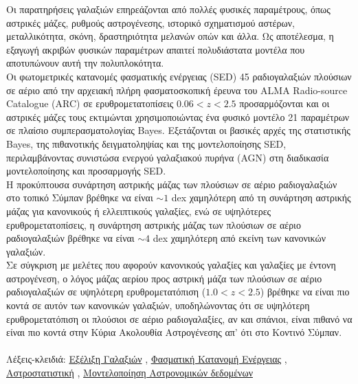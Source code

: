 Οι παρατηρήσεις γαλαξιών επηρεάζονται από πολλές φυσικές παραμέτρους, όπως αστρικές μάζες, ρυθμούς αστρογένεσης, ιστορικό σχηματισμού αστέρων, μεταλλικότητα, σκόνη, δραστηριότητα μελανών οπών και άλλα. Ως αποτέλεσμα, η εξαγωγή ακριβών φυσικών παραμέτρων απαιτεί πολυδιάστατα μοντέλα που αποτυπώνουν αυτή την πολυπλοκότητα.\\
Οι φωτομετρικές κατανομές φασματικής ενέργειας (SED) 45 ραδιογαλαξιών πλούσιων σε αέριο από την αρχειακή πλήρη φασματοσκοπική έρευνα του ALMA Radio-source Catalogue (ARC) σε ερυθρομετατοπίσεις $0.06<z<2.5$ προσαρμόζονται και οι αστρικές μάζες τους εκτιμώνται χρησιμοποιώντας ένα φυσικό μοντέλο 21 παραμέτρων σε πλαίσιο συμπερασματολογίας Bayes. Εξετάζονται οι βασικές αρχές της στατιστικής Bayes, της πιθανοτικής δειγματοληψίας και της μοντελοποίησης SED, περιλαμβάνοντας συνιστώσα ενεργού γαλαξιακού πυρήνα (AGN) στη διαδικασία μοντελοποίησης και προσαρμογής SED.\\
Η προκύπτουσα συνάρτηση αστρικής μάζας των πλούσιων σε αέριο ραδιογαλαξιών στο τοπικό Σύμπαν βρέθηκε να είναι $\sim 1$ dex χαμηλότερη από τη συνάρτηση αστρικής μάζας για κανονικούς ή ελλειπτικούς γαλαξίες, ενώ σε υψηλότερες ερυθρομετατοπίσεις, η συνάρτηση αστρικής μάζας των πλούσιων σε αέριο ραδιογαλαξιών βρέθηκε να είναι $\sim 4$ dex χαμηλότερη από εκείνη των κανονικών γαλαξιών. \\
Σε σύγκριση με μελέτες που αφορούν κανονικούς γαλαξίες και γαλαξίες με έντονη αστρογένεση, ο λόγος μάζας αερίου προς αστρική μάζα των πλούσιων σε αέριο ραδιογαλαξιών σε υψηλότερη ερυθρομετατόπιση ($1.0<z<2.5$) βρέθηκε να είναι πιο κοντά σε αυτόν των κανονικών γαλαξιών, υποδηλώνοντας ότι σε υψηλότερη ερυθρομετατόπιση οι πλούσιοι σε αέριο ραδιογαλαξίες, αν και σπάνιοι, είναι πιθανό να είναι πιο κοντά στην Κύρια Ακολουθία Αστρογένεσης απ' ότι στο Κοντινό Σύμπαν.\\ \\
Λέξεις-κλειδιά: \href{http://astrothesaurus.org/uat/594}{Εξέλιξη Γαλαξιών} , \href{http://astrothesaurus.org/uat/2129}{Φασματική Κατανομή Ενέργειας} , \href{http://astrothesaurus.org/uat/1882}{Αστροστατιστική} , \href{http://astrothesaurus.org/uat/1859}{Μοντελοποίηση Αστρονομικών δεδομένων} 

